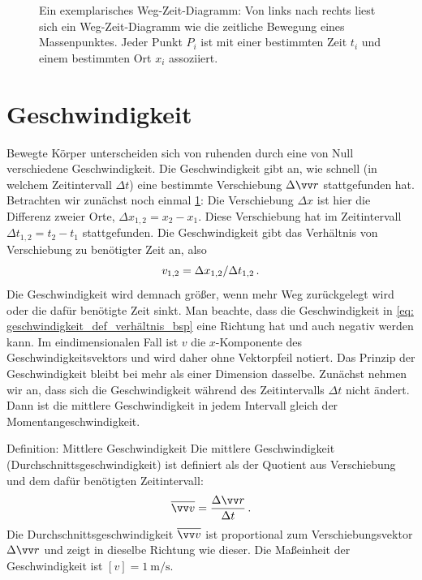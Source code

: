 \begin{figure}[htbp]
\begin{tikzpicture}
    \end{tikzpicture}

    \caption[Ein Weg-Zeit-Diagramm $x(t)$: Zu verschiedenen Zeiten $t_1, t_2, t_3$ beträgt der Ort $x_1, x_2, x_3$.]{Ein exemplarisches Weg-Zeit-Diagramm: Von links nach rechts liest sich ein Weg-Zeit-Diagramm wie die zeitliche Bewegung eines Massenpunktes. Jeder Punkt $P_i$ ist mit einer bestimmten Zeit $t_i$ und einem bestimmten Ort $x_i$ assoziiert.}\label{fig: Weg_zeit_Diagramm_Bsp}
\end{figure}


\section{Geschwindigkeit}\label{sec: Geschwindigkeit}
Bewegte Körper unterscheiden sich von ruhenden durch eine von Null verschiedene Geschwindigkeit. Die Geschwindigkeit gibt an, wie schnell (in welchem Zeitintervall $\Delta t$) eine bestimmte Verschiebung $\Delta\ivec{r}$ stattgefunden hat. Betrachten wir zunächst noch einmal \cref{fig: Weg_zeit_Diagramm_Bsp}: Die Verschiebung $\Delta x$ ist hier die Differenz zweier Orte, \zB $\Delta x_{1,2} = x_2 - x_1$. Diese Verschiebung hat im Zeitintervall $\Delta t_{1,2} = t_2-t_1$ stattgefunden. Die Geschwindigkeit gibt das Verhältnis von Verschiebung zu benötigter Zeit an, also 
\begin{equation}\label{eq: geschwindigkeit_def_verhältnis_bsp}
    v_{1,2} = \Delta x_{1,2}/\Delta t_{1,2}\,.
\end{equation}
Die Geschwindigkeit wird demnach größer, wenn mehr Weg zurückgelegt wird oder die dafür benötigte Zeit sinkt. Man beachte, dass die Geschwindigkeit in \cref{eq: geschwindigkeit_def_verhältnis_bsp} eine Richtung hat und auch negativ werden kann. Im eindimensionalen Fall ist $v$ die $x$-Komponente des Geschwindigkeitsvektors und wird daher ohne Vektorpfeil notiert.
Das Prinzip der Geschwindigkeit bleibt bei mehr als einer Dimension dasselbe. Zunächst nehmen wir an, dass sich die Geschwindigkeit während des Zeitintervalls $\Delta t$ nicht ändert. Dann ist die mittlere Geschwindigkeit in jedem Intervall gleich der Momentangeschwindigkeit. 

\begin{rememberbox}{Definition: Mittlere Geschwindigkeit}
    Die mittlere Geschwindigkeit (Durchschnittsgeschwindigkeit) ist definiert als der Quotient aus Verschiebung und dem dafür benötigten Zeitintervall:
    \begin{equation}\label{eq: def_durchschnittsgeschwindigkeit}
        \overline{\ivec{v}}=\frac{\Delta\ivec{r}}{\Delta t}\mDot
    \end{equation}
    Die Durchschnittsgeschwindigkeit $\overline{\ivec{v}}$ ist proportional zum Verschiebungsvektor $\Delta \ivec{r}$ und zeigt in dieselbe Richtung wie dieser. Die Maßeinheit der Geschwindigkeit ist $[v] = \SI{1}{\meter\per\second}$.
\end{rememberbox}

